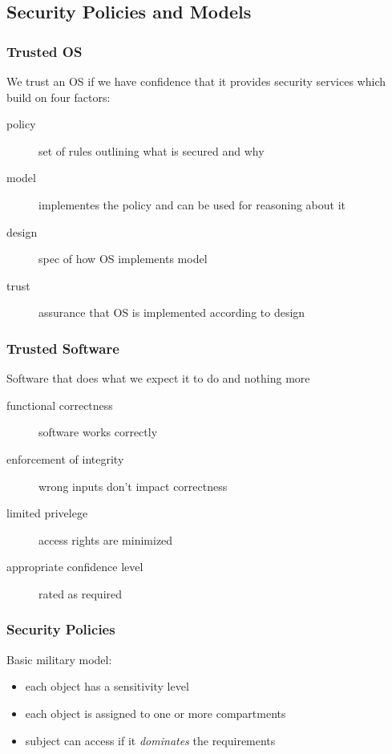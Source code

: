 \documentclass[]{article}
\theoremstyle{definition}
\begin{document}
	\subsection{Security Policies and Models}
	\subsubsection{Trusted OS}
	We trust an OS if we have confidence that it provides security services which build on four factors:
	\begin{description}
		\item[policy] set of rules outlining what is secured and why
		\item[model] implementes the policy and can be used for reasoning about it
		\item[design] spec of how OS implements model
		\item[trust] assurance that OS is implemented according to design
	\end{description}

	\subsubsection{Trusted Software}
	Software that does what we expect it to do and nothing more
	\begin{description}
		\item[functional correctness] software works correctly
		\item[enforcement of integrity] wrong inputs don't impact correctness
		\item[limited privelege] access rights are minimized
		\item[appropriate confidence level] rated as required 
	\end{description}

	\subsubsection{Security Policies}
	Basic military model:
	\begin{itemize}
		\item each object has a sensitivity level
		\item each object is assigned to one or more compartments
		\item subject can access if it \textit{dominates} the requirements
	\end{itemize}
\end{document}
